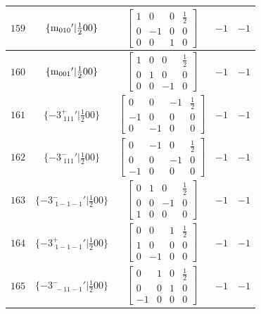 \documentclass[fleqn,8pt]{jsarticle}
\begin{document}
\begin{longtable}{ccccc}
$ 159 $ & $ \{{\rm m}_{010}{}'|\frac{1}{2} 0 0\} $ & $ \begin{bmatrix} 1 & 0 & 0 & \frac{1}{2} \\ 0 & -1 & 0 & 0 \\ 0 & 0 & 1 & 0 \end{bmatrix} $ & $ -1 $ & $ -1 $ \\ \hline
$ 160 $ & $ \{{\rm m}_{001}{}'|\frac{1}{2} 0 0\} $ & $ \begin{bmatrix} 1 & 0 & 0 & \frac{1}{2} \\ 0 & 1 & 0 & 0 \\ 0 & 0 & -1 & 0 \end{bmatrix} $ & $ -1 $ & $ -1 $ \\ \hline
$ 161 $ & $ \{-3^{+}_{\,\,111}{}'|\frac{1}{2} 0 0\} $ & $ \begin{bmatrix} 0 & 0 & -1 & \frac{1}{2} \\ -1 & 0 & 0 & 0 \\ 0 & -1 & 0 & 0 \end{bmatrix} $ & $ -1 $ & $ -1 $ \\ \hline
$ 162 $ & $ \{-3^{-}_{\,\,111}{}'|\frac{1}{2} 0 0\} $ & $ \begin{bmatrix} 0 & -1 & 0 & \frac{1}{2} \\ 0 & 0 & -1 & 0 \\ -1 & 0 & 0 & 0 \end{bmatrix} $ & $ -1 $ & $ -1 $ \\ \hline
$ 163 $ & $ \{-3^{-}_{\,\,1-1-1}{}'|\frac{1}{2} 0 0\} $ & $ \begin{bmatrix} 0 & 1 & 0 & \frac{1}{2} \\ 0 & 0 & -1 & 0 \\ 1 & 0 & 0 & 0 \end{bmatrix} $ & $ -1 $ & $ -1 $ \\ \hline
$ 164 $ & $ \{-3^{+}_{\,\,1-1-1}{}'|\frac{1}{2} 0 0\} $ & $ \begin{bmatrix} 0 & 0 & 1 & \frac{1}{2} \\ 1 & 0 & 0 & 0 \\ 0 & -1 & 0 & 0 \end{bmatrix} $ & $ -1 $ & $ -1 $ \\ \hline
$ 165 $ & $ \{-3^{-}_{\,\,-11-1}{}'|\frac{1}{2} 0 0\} $ & $ \begin{bmatrix} 0 & 1 & 0 & \frac{1}{2} \\ 0 & 0 & 1 & 0 \\ -1 & 0 & 0 & 0 \end{bmatrix} $ & $ -1 $ & $ -1 $ \\ \hline

\end{longtable}
\end{document}
